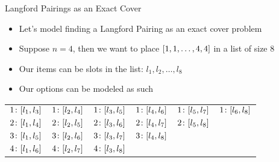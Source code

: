 \documentclass[aspectratio=169]{beamer}
\begin{document}
\begin{frame}{Langford Pairings as an Exact Cover}
    \begin{itemize}
        \item Let's model finding a Langford Pairing as an exact cover problem
        \item Suppose $n = 4$, then we want to place $\bqty{1, 1, \ldots, 4, 4}$ in a list of size 8
        \item Our items can be slots in the list: $l_1, l_2, \ldots, l_8$
        \item Our options can be modeled as such
    \end{itemize}
    \begin{table}[]
        \begin{tabular}{llllll}
            $1\colon \bqty{l_1, l_3}$ & $1\colon \bqty{l_2, l_4}$ & $1\colon \bqty{l_3, l_5}$ & $1\colon \bqty{l_4, l_6}$ & $1\colon \bqty{l_5, l_7}$ & $1\colon \bqty{l_6, l_8}$ \\[10pt]
            $2\colon \bqty{l_1, l_4}$ & $2\colon \bqty{l_2, l_5}$ & $2\colon \bqty{l_3, l_6}$ & $2\colon \bqty{l_4, l_7}$ & $2\colon \bqty{l_5, l_8}$ &                           \\[10pt]
            $3\colon \bqty{l_1, l_5}$ & $3\colon \bqty{l_2, l_6}$ & $3\colon \bqty{l_3, l_7}$ & $3\colon \bqty{l_4, l_8}$ &                           &                           \\[10pt]
            $4\colon \bqty{l_1, l_6}$ & $4\colon \bqty{l_2, l_7}$ & $4\colon \bqty{l_3, l_8}$ &                           &                           &                          
        \end{tabular}
    \end{table}
\end{frame}
\end{document}
